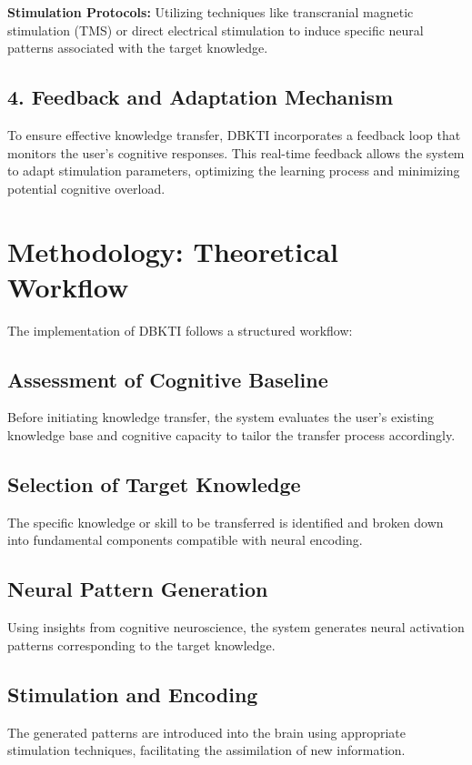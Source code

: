\documentclass[12pt]{article}
\begin{document}
\textbf{Stimulation Protocols:} Utilizing techniques like transcranial magnetic stimulation (TMS) or direct electrical stimulation to induce specific neural patterns associated with the target knowledge.

\subsection*{4. Feedback and Adaptation Mechanism}
To ensure effective knowledge transfer, DBKTI incorporates a feedback loop that monitors the user's cognitive responses. This real-time feedback allows the system to adapt stimulation parameters, optimizing the learning process and minimizing potential cognitive overload.

\section*{Methodology: Theoretical Workflow}
The implementation of DBKTI follows a structured workflow:

\subsection*{Assessment of Cognitive Baseline}
Before initiating knowledge transfer, the system evaluates the user's existing knowledge base and cognitive capacity to tailor the transfer process accordingly.

\subsection*{Selection of Target Knowledge}
The specific knowledge or skill to be transferred is identified and broken down into fundamental components compatible with neural encoding.

\subsection*{Neural Pattern Generation}
Using insights from cognitive neuroscience, the system generates neural activation patterns corresponding to the target knowledge.

\subsection*{Stimulation and Encoding}
The generated patterns are introduced into the brain using appropriate stimulation techniques, facilitating the assimilation of new information.
\end{document}
